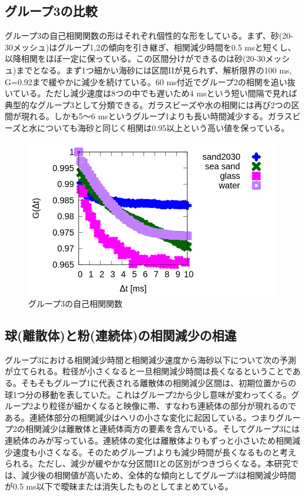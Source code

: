 \documentclass[a4paper,10pt,twocolumn,dvipdfmx]{jsarticle}
\newcommand{\II}{I\hspace{-.1em}I}
\begin{document}
\subsection{グループ3の比較}
グループ3の自己相関関数の形はそれぞれ個性的な形をしている。まず、砂(20-30メッシュ)はグループ1,2の傾向を引き継ぎ、相関減少時間を0.5 msと短くし、以降相関をほぼ一定に保っている。この区間分けができるのは砂(20-30メッシュ)までとなる。まず1つ細かい海砂には区間\II が見られず、解析限界の100 ms, G=0.92まで緩やかに減少を続けている。60 ms付近でグループ2の相関を追い抜いている。ただし減少速度は8つの中でも遅いため4 msという短い間隔で見れば典型的なグループ3として分類できる。ガラスビーズや水の相関には再び2つの区間が現れる。しかも5～6 msというグループ1よりも長い時間減少する。ガラスビーズと水についても海砂と同じく相関は0.95以上という高い値を保っている。
\begin{figure}[H]
	\includegraphics[scale=0.4]{three_up.png}
	\caption{グループ3の自己相関関数}
	\label{fig:three}
\end{figure}
\subsection{球(離散体)と粉(連続体)の相関減少の相違}
グループ3における相関減少時間と相関減少速度から海砂以下について次の予測が立てられる。粒径が小さくなると一旦相関減少時間は長くなるということである。そもそもグループ1に代表される離散体の相関減少区間は、初期位置からの球1つ分の移動を表していた。これはグループ2から少し意味が変わってくる。グループ2より粒径が細かくなると映像に帯、すなわち連続体の部分が現れるのである。連続体部分の相関減少はヘリの小さな変化に起因している。つまりグループ2の相関減少は離散体と連続体両方の要素を含んでいる。そしてグループ3には連続体のみが写っている。連続体の変化は離散体よりもずっと小さいため相関減少速度も小さくなる。そのためグループ1よりも減少時間が長くなるものと考えられる。ただし、減少が緩やかな分区間\II との区別がつきづらくなる。本研究では、減少後の相関値が高いため、全体的な傾向としてグループ3は相関減少時間が0.5 ms以下で曖昧または消失したものとしてまとめている。
\end{document}
